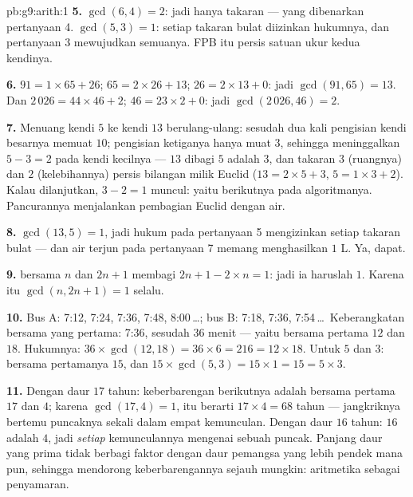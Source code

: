 \begin{solution}{pb:g9:arith:1}
\textbf{5.} $\gcd(6, 4) = 2$: jadi hanya takaran  --- yang
dibenarkan pertanyaan 4. $\gcd(5, 3) = 1$: setiap takaran bulat
diizinkan hukumnya, dan pertanyaan 3 mewujudkan semuanya. FPB itu
persis satuan ukur kedua kendinya.

\textbf{6.} $91 = 1 \times 65 + 26$; $65 = 2 \times 26 + 13$;
$26 = 2 \times 13 + 0$: jadi $\gcd(91, 65) = 13$. Dan
$2\,026 = 44 \times 46 + 2$; $46 = 23 \times 2 + 0$:
jadi $\gcd(2\,026, 46) = 2$.

\textbf{7.} Menuang kendi $5$ ke kendi $13$ berulang-ulang: sesudah
dua kali pengisian kendi besarnya memuat $10$; pengisian ketiganya
hanya muat $3$, sehingga meninggalkan $5 - 3 = 2$ pada kendi kecilnya
--- 
$13$ dibagi $5$ adalah $3$, dan takaran $3$ (ruangnya) dan $2$
(kelebihannya) persis bilangan milik Euclid ($13 = 2 \times 5 + 3$,
$5 = 1 \times 3 + 2$). Kalau dilanjutkan, $3 - 2 = 1$ muncul: yaitu
 berikutnya pada algoritmanya. Pancurannya menjalankan pembagian
Euclid dengan air.

\textbf{8.} $\gcd(13, 5) = 1$, jadi hukum pada pertanyaan 5
mengizinkan setiap takaran bulat --- dan air terjun pada pertanyaan 7
memang menghasilkan $1$ L. Ya, dapat.

\textbf{9.}  bersama $n$ dan $2n + 1$ membagi
$2n + 1 - 2 \times n = 1$: jadi ia haruslah $1$. Karena itu
$\gcd(n, 2n+1) = 1$ selalu.

\textbf{10.} Bus A: 7:12, 7:24, 7:36, 7:48, 8:00\,\dots; bus B:
7:18, 7:36, 7:54\,\dots\ Keberangkatan bersama yang pertama: 7:36,
sesudah $36$ menit --- yaitu  bersama pertama $12$ dan $18$.
Hukumnya: $36 \times \gcd(12, 18) = 36 \times 6 = 216 = 12 \times
18$. Untuk $5$ dan $3$:  bersama pertamanya $15$, dan
$15 \times \gcd(5,3) = 15 \times 1 = 15 = 5 \times 3$.

\textbf{11.} Dengan daur $17$ tahun: keberbarengan berikutnya adalah
 bersama pertama $17$ dan $4$; karena
$\gcd(17, 4) = 1$, itu berarti $17 \times 4 = 68$ tahun --- jangkriknya
bertemu puncaknya sekali dalam empat kemunculan. Dengan daur
$16$ tahun: $16$ adalah  $4$, jadi \emph{setiap}
kemunculannya mengenai sebuah puncak. Panjang daur yang prima tidak
berbagi faktor dengan daur pemangsa yang lebih pendek mana pun,
sehingga mendorong keberbarengannya sejauh mungkin: aritmetika sebagai
penyamaran.


\end{solution}
